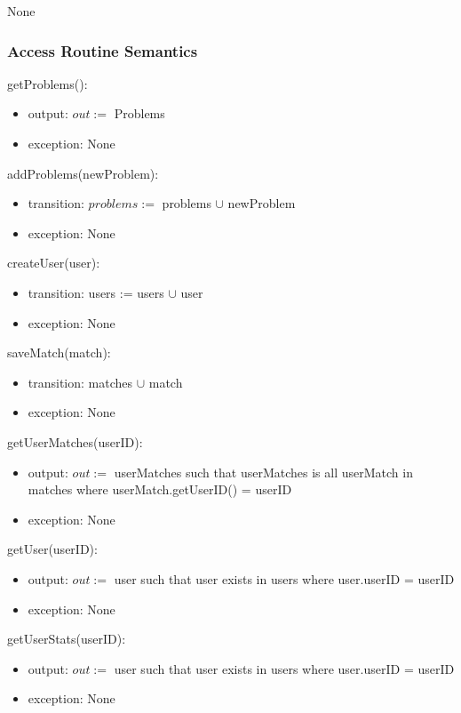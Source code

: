 \documentclass[12pt, titlepage]{article}
\begin{document}
None

\subsubsection{Access Routine Semantics}

\noindent getProblems():
\begin{itemize}
\item output: $out :=$ Problems
\item exception: None
\end{itemize}

\noindent addProblems(newProblem):
\begin{itemize}
\item transition: $problems :=$ problems $\cup$ newProblem
\item exception: None
\end{itemize}

\noindent createUser(user):
\begin{itemize}
\item transition: users := users  $\cup$ user
\item exception: None
\end{itemize}

\noindent saveMatch(match):
\begin{itemize}
\item transition: matches $\cup$ match 
\item exception: None
\end{itemize}

\noindent getUserMatches(userID):
\begin{itemize}
\item output:  $out :=$ userMatches such that userMatches is all userMatch in matches where userMatch.getUserID() = userID
\item exception: None
\end{itemize}

\noindent getUser(userID):
\begin{itemize}
\item output: $out :=$ user such that user exists in users where user.userID = userID
\item exception: None 
\end{itemize}

\noindent getUserStats(userID):
\begin{itemize}
\item output: $out :=$ user such that user exists in users where user.userID = userID
\item exception: None
\end{itemize}
\end{document}
